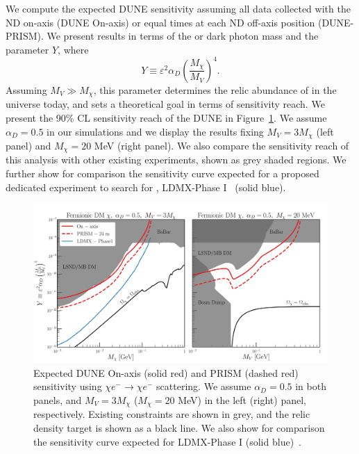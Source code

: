 We compute the expected DUNE sensitivity assuming all data collected with the ND on-axis (DUNE On-axis) or equal times at each ND off-axis position (DUNE-PRISM). We present results in terms of the  or dark photon mass and the parameter $Y$, where
\begin{equation}
Y \equiv \varepsilon^2 \alpha_D \left(\frac{M_\chi}{M_V}\right)^4.    
\end{equation}
Assuming $M_V \gg M_\chi$, this parameter determines the relic abundance of  in the universe today, and sets a theoretical goal in terms of sensitivity reach. We present the 90\% CL sensitivity reach of the DUNE  in Figure~\ref{fig:chisq}. 
We assume $\alpha_D = 0.5$ in our simulations and we display the results fixing $M_V = 3M_\chi$ (left panel) and $M_\chi = 20$ MeV (right panel).
We also compare the sensitivity reach of this analysis with other existing experiments, shown as grey shaded regions. We further show for comparison the sensitivity curve expected for a proposed dedicated experiment to search for , LDMX-Phase I~\cite{Akesson:2018vlm} (solid blue).

 \begin{figure}[t]
 \centering
 \includegraphics[width=\linewidth]{graphics/LDM_Sensitivity.pdf}
 \caption[90$\%$  limit for Y as a function of $m_{\chi}$ at the ND]{\label{fig:chisq} Expected DUNE On-axis (solid red) and PRISM (dashed red) sensitivity using $\chi e^- \to \chi e^-$ scattering. We assume $\alpha_D = 0.5$ in both panels, and $M_V = 3M_\chi$ ($M_\chi = 20$ MeV) in the left (right) panel, respectively. Existing constraints are shown in grey, and the relic density target is shown as a black line. We also show for comparison the sensitivity curve expected for LDMX-Phase I (solid blue)~\cite{Akesson:2018vlm}.
 }
 \end{figure}

